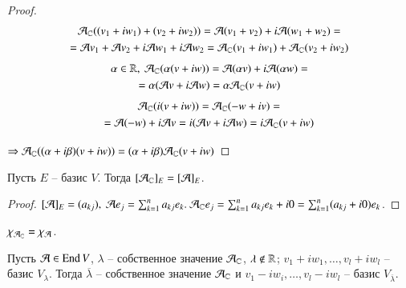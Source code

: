 \documentclass[main]{subfiles}
\begin{document}
\begin{proof}
    \begin{multline*}
        \mathcal{A}_{\mathbb{C}}((v_1+iw_1)+(v_2+ iw_2)) = \mathcal{A}(v_1 + v_2) + i\mathcal{A}(w_1 + w_2) = \\
   = \mathcal{A} v_1 + \mathcal{A} v_2 + i\mathcal{A} w_1 + i\mathcal{A} w_2 = \mathcal{A}_{\mathbb{C}}(v_1 + iw_1) + \mathcal{A}_{\mathbb{C}}(v_2 + iw_2)
    \end{multline*}
\begin{multline*}
    \alpha \in \mathbb{R}, \ \mathcal{A}_{\mathbb{C}}(\alpha(v + iw)) = \mathcal{A}(\alpha v) + i\mathcal{A}(\alpha w) = \\
   = \alpha(\mathcal{A} v + i\mathcal{A} w) = \alpha \mathcal{A}_{\mathbb{C}}(v+ iw)
\end{multline*}
\begin{multline*}
    \mathcal{A}_{\mathbb{C}}(i(v+i w)) = \mathcal{A}_{\mathbb{C}}(-w + iv) = \\
    = \mathcal{A}(-w) + i\mathcal{A} v = i(\mathcal{A} v + i\mathcal{A} w) = i \mathcal{A}_{\mathbb{C}}(v + iw)
\end{multline*}
    

    $\Rightarrow \mathcal{A}_{\mathbb{C}}((\alpha + i\beta)(v+iw)) = (\alpha + i\beta)\mathcal{A}_{\mathbb{C}}(v+iw)$
\end{proof}

\begin{proposition}
    Пусть $E$ -- базис $V$. Тогда $[\mathcal{A}_{\mathbb{C}}]_E = [\mathcal{A}]_E$.
\end{proposition}

\begin{proof}
    $[\mca]_E = (a_{kj}), \ \mca e_j = \sum_{k=1}^n a_{kj} e_k. \ \mca_{\C}e_j = \sum_{k=1}^{n}a_{kj}e_k + i0 = \sum_{k=1}^n(a_{kj} + i0)e_k$.
\end{proof}

\begin{corollary}
    $\chi_{\mathcal{A}_{\mathbb{C}}} = \chi_{\mathcal{A}}$.
\end{corollary}

\begin{proposition}
    Пусть $\mathcal{A} \in \operatorname{End} V$, $\lambda$ -- собственное значение $\mathcal{A}_{\mathbb{C}}$, $\lambda \not\in \mathbb{R}$;
    $v_1+iw_1, \ldots, v_l+iw_l$ -- базис $V_{\lambda}$. Тогда $\overline{\lambda}$ -- собственное 
    значение $\mathcal{A}_{\mathbb{C}}$ и $v_1-iw_i, \ldots, v_l-iw_l$ -- базис $V_{\overline{\lambda}}$.
\end{proposition}
\end{document}
